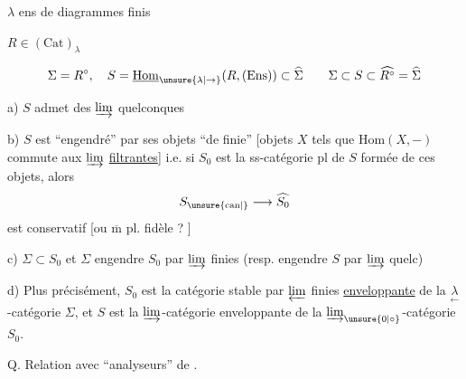$\lambda$ ens de diagrammes finis

$R\in(\mathrm{Cat})_{\lambda}$ 

\[
\Sigma=R^\circ,\quad S=\underline{\mathrm{Hom}}_{\unsure{\lambda|\to}}(R,(\mathrm{Ens}))\subset\widehat{\Sigma}
\qquad\Sigma\subset S\subset\widehat{R^\circ}=\widehat\Sigma
\]

a) $S$ admet des $\varinjlim$ quelconques

b) $S$ est ``engendré'' par ses objets ``de  finie'' [objets $X$ tels que $\mathrm{Hom}(X,-)$ commute aux $\varinjlim$ \uline{filtrantes}] i.e. si $S_0$ est la ss-catégorie pl de $S$ formée de ces objets, alors
\[
 S_{\unsure{\mathrm{can}|{}}}\longrightarrow\widehat{S_0}
\]
est conservatif [ou $\overline{\mathrm m}$ pl. fidèle ? ]

c) $\Sigma\subset S_0$ et $\Sigma$ engendre $S_0$ par $\varinjlim$ finies (resp. engendre $S$ par $\varinjlim$ quelc)

d) Plus précisément, $S_0$ est la catégorie stable par $\varprojlim$ finies \uline{enveloppante} de la $\underset{\leftarrow}{\lambda}$-catégorie $\Sigma$, et $S$ est la $\varinjlim$-catégorie enveloppante de la $\varinjlim_{\unsure{0|\circ}}$-catégorie $S_0$.

Q. Relation avec ``analyseurs'' de .
